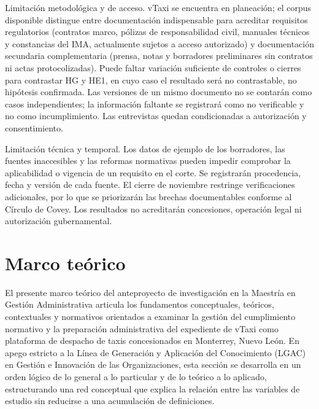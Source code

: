 {Limitación metodológica y de acceso. vTaxi se encuentra en planeación; el corpus disponible distingue entre documentación indispensable para acreditar requisitos regulatorios (contratos marco, pólizas de responsabilidad civil, manuales técnicos y constancias del IMA, actualmente sujetos a acceso autorizado) y documentación secundaria complementaria (prensa, notas y borradores preliminares sin contratos ni actas protocolizadas). Puede faltar variación suficiente de controles o cierres para contrastar HG y HE1, en cuyo caso el resultado será no contrastable, no hipótesis confirmada. Las versiones de un mismo documento no se contarán como casos independientes; la información faltante se registrará como no verificable y no como incumplimiento. Las entrevistas quedan condicionadas a autorización y consentimiento.


Limitación técnica y temporal. Los datos de ejemplo de los borradores, las fuentes inaccesibles y las reformas normativas pueden impedir comprobar la aplicabilidad o vigencia de un requisito en el corte. Se registrarán procedencia, fecha y versión de cada fuente. El cierre de noviembre restringe verificaciones adicionales, por lo que se priorizarán las brechas documentables conforme al Círculo de Covey. Los resultados no acreditarán concesiones, operación legal ni autorización gubernamental.


\section{Marco teórico}
El presente marco teórico del anteproyecto de investigación en la Maestría en Gestión Administrativa articula los fundamentos conceptuales, teóricos, contextuales y normativos orientados a examinar la gestión del cumplimiento normativo y la preparación administrativa del expediente de vTaxi como plataforma de despacho de taxis concesionados en Monterrey, Nuevo León. En apego estricto a la Línea de Generación y Aplicación del Conocimiento (LGAC) en Gestión e Innovación de las Organizaciones, esta sección se desarrolla en un orden lógico de lo general a lo particular y de lo teórico a lo aplicado, estructurando una red conceptual que explica la relación entre las variables de estudio sin reducirse a una acumulación de definiciones.


}
